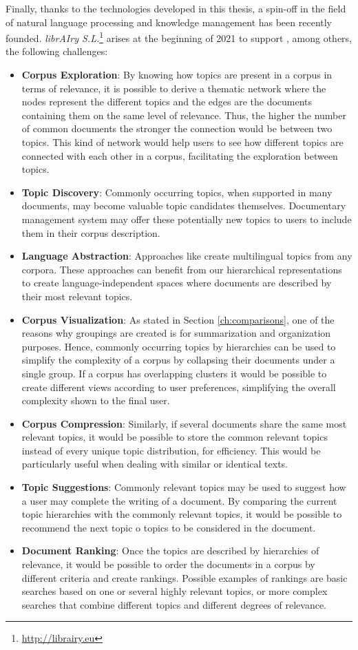 Finally, thanks to the technologies developed in this thesis, a spin-off in the field of natural language processing and knowledge management has been recently founded. \textit{librAIry S.L.}\footnote{\url{http://librairy.eu}} arises at the beginning of 2021 to support , among others, the following challenges:
\begin{itemize}
\item \textbf{Corpus Exploration}: By knowing how topics are present in a corpus in terms of relevance, it is possible to derive a thematic network where the nodes represent the different topics and the edges are the documents containing them on the same level of relevance. Thus, the higher the number of common documents the stronger the connection would be between two topics. This kind of network would help users to see how different topics are connected with each other in a corpus, facilitating the exploration between topics.
\item \textbf{Topic Discovery}: Commonly occurring topics, when supported in many documents, may become valuable topic candidates themselves. Documentary management system may offer these potentially new topics to users to include them in their corpus description.
\item \textbf{Language Abstraction}: Approaches like \citep{hao-paul-2018-learning} create multilingual topics from any corpora. These approaches can benefit from our hierarchical representations to create language-independent spaces where documents are described by their most relevant topics.
\item \textbf{Corpus Visualization}: As stated in Section \ref{ch:comparisons}, one of the reasons why groupings are created is for summarization and organization purposes. Hence, commonly occurring topics by hierarchies can be used to simplify the complexity of a corpus by collapsing their documents under a single group. If a corpus has overlapping clusters it would be possible to create different views according to user preferences, simplifying the overall complexity shown to the final user.
\item \textbf{Corpus Compression}: Similarly, if several documents share the same most relevant topics, it would be possible to store the common relevant topics instead of every unique topic distribution, for efficiency. This would be particularly useful when dealing with similar or identical texts.
\item \textbf{Topic Suggestions}: Commonly relevant topics may be used to suggest how a user may complete the writing of a document. By comparing the current topic hierarchies with the commonly relevant topics, it would be possible to recommend the next topic o topics to be considered in the document.
\item \textbf{Document Ranking}: Once the topics are described by hierarchies of relevance, it would be possible to order the documents in a corpus by different criteria and create rankings. Possible examples of rankings are basic searches based on one or several highly relevant topics, or more complex searches that combine different topics and different degrees of relevance.  
\end{itemize}


